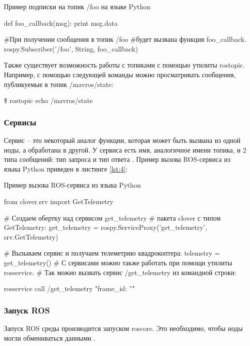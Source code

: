 \begin{Program}[H]
	\caption{Пример подписки на топик /foo на языке Python} \label{lst:3}
\begin{MyCode}
	def foo_callback(msg):
		print msg.data
	
	#При получении сообщения в топик /foo
	#будет вызвана функция foo_callback.
	rospy.Subscriber('/foo', String, foo_callback)
\end{MyCode}
\end{Program}

Также существует возможность работы с топиками с помощью утилиты rostopic. Например, с помощью следующей команды можно просматривать сообщения, публикуемые в топик /mavros/state:

\$ rostopic echo /mavros/state
\subsubsection{Сервисы}

Сервис -- это некоторый аналог функции, которая может быть вызвана из одной ноды, а обработана в другой. У сервиса есть имя, аналогичное имени топика, и 2 типа сообщений: тип запроса и тип ответа \cite{clover}. Пример вызова ROS-сервиса из языка Python приведен в листинге \ref{lst:4}:

\begin{Program}[H]
	\caption{Пример вызова ROS-сервиса из языка Python} \label{lst:4}
\begin{MyCode}
	from clover.srv import GetTelemetry
	
	# Создаем обертку над сервисом get_telemetry
	# пакета clover с типом GetTelemetry:
	get_telemetry = rospy.ServiceProxy('get_telemetry',
	  srv.GetTelemetry)
	
	# Вызываем сервис и получаем телеметрию квадрокоптера:
	telemetry = get_telemetry()
	# С сервисами можно также работать при помощи утилиты rosservice.
	# Так можно вызвать сервис /get_telemetry из командной строки:
	
	rosservice call /get_telemetry "{frame_id: ''}"
\end{MyCode}
\end{Program}

\subsubsection{Запуск ROS}
Запуск ROS среды производится запуском roscore. Это необходимо, чтобы ноды могли обмениваться данными \cite{pkg}.


